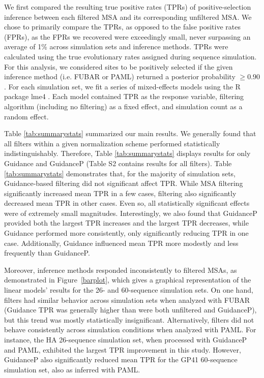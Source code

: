 \documentclass[11pt]{article}
\begin{document}
We first compared the resulting true positive rates (TPRs) of positive-selection inference between each filtered MSA and its corresponding unfiltered MSA. We chose to primarily compare the TPRs, as opposed to the false positive rates (FPRs), as the FPRs we recovered were exceedingly small, never surpassing an average of 1\% across simulation sets and inference methods. TPRs were calculated using the true evolutionary rates assigned during sequence simulation. For this analysis, we considered sites to be positively selected if the given inference method (i.e. FUBAR or PAML) returned a posterior probability $\geq0.90$. For each simulation set, we fit a series of mixed-effects models using the R package lme4 \citep{Bates2012}. Each model contained TPR as the response variable, filtering algorithm (including no filtering) as a fixed effect, and simulation count as a random effect.

Table \ref{tab:summarystats} summarized our main results. We generally found that all filters within a given normalization scheme performed statistically indistinguishably. Therefore, Table \ref{tab:summarystats} displays results for only Guidance and GuidanceP (Table S2 contains results for all filters). Table \ref{tab:summarystats} demonstrates that, for the majority of simulation sets, Guidance-based filtering did not significant affect TPR. While MSA filtering significantly increased mean TPR in a few cases, filtering also significantly decreased mean TPR in other cases. Even so, all statistically significant effects were of extremely small magnitudes. Interestingly, we also found that GuidanceP provided both the largest TPR increases and the largest TPR decreases, while Guidance performed more consistently, only significantly reducing TPR in one case. Additionally, Guidance influenced mean TPR more modestly and less frequently than GuidanceP.

Moreover, inference methods responded inconsistently to filtered MSAs, as demonstrated in Figure~\ref{barplot}, which gives a graphical representation of the linear models' results for the 26- and 60-sequence simulation sets. On one hand, filters had similar behavior across simulation sets when analyzed with FUBAR (Guidance TPR was generally higher than were both unfiltered and GuidanceP), but this trend was mostly statistically insignificant. Alternatively, filters did not behave consistently across simulation conditions when analyzed with PAML. For instance, the HA 26-sequence simulation set, when processed with GuidanceP and PAML, exhibited the largest TPR improvement in this study. However, GuidanceP also significantly reduced mean TPR for the GP41 60-sequence simulation set, also as inferred with PAML. 
\end{document}
